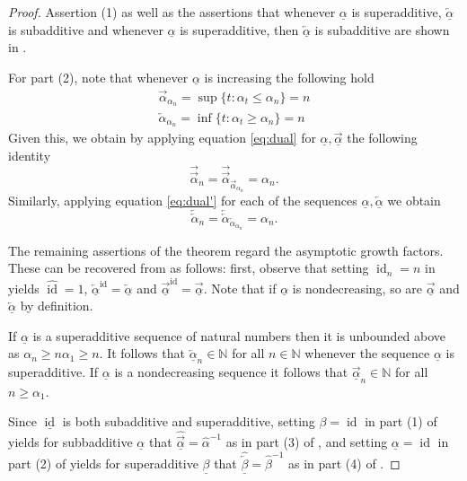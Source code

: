 \documentclass[12pt, reqno]{amsart}
\numberwithin{equation}{section}
\def\a{\ensuremath{\alpha}}
\def\ua{\ensuremath{\underline{\alpha}}}
\def\b{\ensuremath{\beta}}
\def\ub{\ensuremath{\underline{\beta}}}
\newcommand{\wa}{\widehat{\alpha}}
\newcommand{\wb}{\widehat{\beta}}
\newcommand{\N}{{\mathbb N}}
\def\id{{\operatorname{id}}}
\theoremstyle{plain} %
\theoremstyle{definition}
\theoremstyle{remark}
\newcommand{\uao}{\overleftarrow{\ua}}
\newcommand{\uau}{\overrightarrow{\ua}}
\newcommand{\ao}{\overleftarrow{\alpha}}
\newcommand{\au}{\overrightarrow{\alpha}}
\newcommand{\ubo}{\overleftarrow{\ub}}
\begin{document}
\begin{proof}
% 

Assertion (1) as well as the assertions that whenever $\ua$ is superadditive,  $\uao$ is subadditive and whenever $\ua$ is superadditive, then $\uao$ is subadditive are shown in \cite[Corollary 2.8]{Johnson11}. 

For part (2), note that  whenever $\ua$ is increasing the following hold
\begin{eqnarray}
\label{eq:dual}
 \au_{\a_n}=  \sup\{t: \a_t\leq \a_n\}=  n\\
\label{eq:dual'}
 \ao_{\a_n}=  \inf\{t: \a_t\geq \a_n\}=  n
\end{eqnarray}
 Given this, we obtain by applying equation \eqref{eq:dual} for  $\ua, \uau$ the following identity
 \[
\overrightarrow{\au}_n= \overrightarrow{\au}_{ \au_{\a_n}}=\a_n.
 \]
Similarly,  applying equation \eqref{eq:dual'} for each of the sequences $\ua, \uao$ we obtain
 \[
 \overleftarrow{\ao}_n= \overleftarrow{\ao}_{ \ao_{\a_n}}=\a_n.
 \]


The remaining assertions of the theorem regard the asymptotic growth factors. These can be recovered from    as follows: first, observe that setting $\id_n=n$ in yields $\widehat{\id}=1$, $\uao^\id=\uao$ and $\uau^\id=\uau$. Note that if $\ua$ is nondecreasing, so are $\uau$ and $\uao$ by definition.

If $\ua$ is a superadditive sequence of natural numbers then it is unbounded above as $\a_n\geq n\a_1\geq n$. It follows that  $\uao_n\in \N$ for all $n\in\N$ whenever the sequence $\ua$ is superadditive. If $\ua$ is a nondecreasing sequence it follows that $\uau_n\in \N$ for all $n\geq \a_1$.

Since  $\underline{\id}$ is both subadditive and superadditive, setting $\b=\id$ in part (1) of  yields for subbadditive $\ua$ that $\widehat{\uau}=\wa^{-1}$ as in part (3) of , and setting $\ua=\id$ in part (2) of  yields for superadditive $\ub$ that $\widehat{\ubo}=\wb^{-1}$ as in part (4) of . 





\end{proof}
\end{document}
